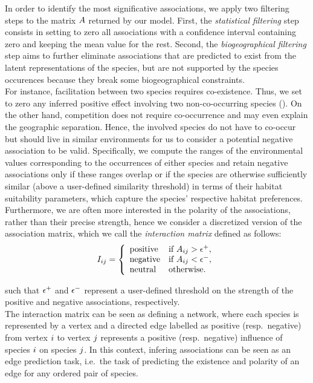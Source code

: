 \documentclass[10pt,a4paper]{article}
\begin{document}
In order to identify the most significative associations, we apply two filtering steps to the matrix $A$ returned by our model. First, the \emph{statistical filtering} step consists in setting to zero all associations with a confidence interval containing zero and keeping the mean value for the rest. Second, the \emph{biogeographical filtering} step aims to further eliminate associations that are predicted to exist from the latent representations of the species, but are not supported by the species occurences because they break some biogeographical constraints. \\

For instance, facilitation between two species requires co-existence. Thus, we set to zero any inferred positive effect involving two non-co-occurring species (\cite{sanderson2015patterns}). On the other hand, competition does not require co-occurrence and may even explain the geographic separation. Hence, the involved species do not have to co-occur but should live in similar environments for us to consider a potential negative association to be valid. Specifically, we compute the ranges of the environmental values corresponding to the occurrences of either species and retain negative associations only if these ranges overlap or if the species are otherwise sufficiently similar (above a user-defined similarity threshold) in terms of their habitat suitability parameters, which capture the species' respective habitat preferences. \\

Furthermore, we are often more interested in the polarity of the associations, rather than their precise strength, hence we consider a discretized version of the association matrix, which we call the \emph{interaction matrix} defined as follows:
\begin{equation*}
I_{ij} =  \left\{
\begin{array}{ll}
\text{positive} & \mbox{if } A_{ij}>\epsilon^+, \\
\text{negative} & \mbox{if } A_{ij}<\epsilon^-, \\
\text{neutral} & \mbox{otherwise.}
\end{array}
\right.
\end{equation*}

such that $\epsilon^+$ and $\epsilon^-$ represent a user-defined threshold on the strength of the positive and negative associations, respectively. \\

The interaction matrix can be seen as defining a network, where each species is represented by a vertex and a directed edge labelled as positive (resp.\ negative) from vertex $i$ to vertex $j$ represents a positive (resp.\ negative) influence of species $i$ on species $j$.
In this context, infering associations can be seen as an edge prediction task, i.e.\ the task of predicting the existence and polarity of an edge for any ordered pair of species.\\
\end{document}
